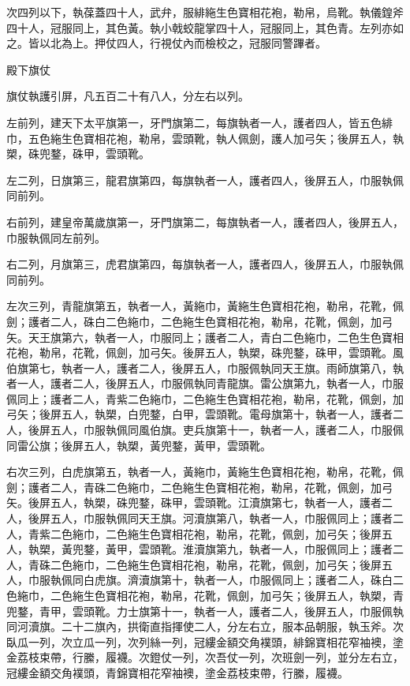 \begin{pinyinscope}
 次四列以下，執葆蓋四十人，武弁，服緋絁生色寶相花袍，勒帛，烏靴。執儀鍠斧四十人，冠服同上，其色黃。執小戟蛟龍掌四十人，冠服同上，其色青。左列亦如之。皆以北為上。押仗四人，行視仗內而檢校之，冠服同警蹕者。



 殿下旗仗



 旗仗執護引屏，凡五百二十有八人，分左右以列。



 左前列，建天下太平旗第一，牙門旗第二，每旗執者一人，護者四人，皆五色緋巾，五色絁生色寶相花袍，勒帛，雲頭靴，執人佩劍，護人加弓矢；後屏五人，執槊，硃兜鍪，硃甲，雲頭靴。



 左二列，日旗第三，龍君旗第四，每旗執者一人，護者四人，後屏五人，巾服執佩同前列。



 右前列，建皇帝萬歲旗第一，牙門旗第二，每旗執者一人，護者四人，後屏五人，巾服執佩同左前列。



 右二列，月旗第三，虎君旗第四，每旗執者一人，護者四人，後屏五人，巾服執佩同前列。



 左次三列，青龍旗第五，執者一人，黃絁巾，黃絁生色寶相花袍，勒帛，花靴，佩劍；護者二人，硃白二色絁巾，二色絁生色寶相花袍，勒帛，花靴，佩劍，加弓矢。天王旗第六，執者一人，巾服同上；護者二人，青白二色絁巾，二色生色寶相花袍，勒帛，花靴，佩劍，加弓矢。後屏五人，執槊，硃兜鍪，硃甲，雲頭靴。風伯旗第七，執者一人，護者二人，後屏五人，巾服佩執同天王旗。雨師旗第八，執者一人，護者二人，後屏五人，巾服佩執同青龍旗。雷公旗第九，執者一人，巾服佩同上；護者二人，青紫二色絁巾，二色絁生色寶相花袍，勒帛，花靴，佩劍，加弓矢；後屏五人，執槊，白兜鍪，白甲，雲頭靴。電母旗第十，執者一人，護者二人，後屏五人，巾服執佩同風伯旗。吏兵旗第十一，執者一人，護者二人，巾服佩同雷公旗；後屏五人，執槊，黃兜鍪，黃甲，雲頭靴。



 右次三列，白虎旗第五，執者一人，黃絁巾，黃絁生色寶相花袍，勒帛，花靴，佩劍；護者二人，青硃二色絁巾，二色絁生色寶相花袍，勒帛，花靴，佩劍，加弓矢。後屏五人，執槊，硃兜鍪，硃甲，雲頭靴。江瀆旗第七，執者一人，護者二人，後屏五人，巾服執佩同天王旗。河瀆旗第八，執者一人，巾服佩同上；護者二人，青紫二色絁巾，二色絁生色寶相花袍，勒帛，花靴，佩劍，加弓矢；後屏五人，執槊，黃兜鍪，黃甲，雲頭靴。淮瀆旗第九，執者一人，巾服佩同上；護者二人，青硃二色絁巾，二色絁生色寶相花袍，勒帛，花靴，佩劍，加弓矢；後屏五人，巾服執佩同白虎旗。濟瀆旗第十，執者一人，巾服佩同上；護者二人，硃白二色絁巾，二色絁生色寶相花袍，勒帛，花靴，佩劍，加弓矢；後屏五人，執槊，青兜鍪，青甲，雲頭靴。力士旗第十一，執者一人，護者二人，後屏五人，巾服佩執同河瀆旗。二十二旗內，拱衛直指揮使二人，分左右立，服本品朝服，執玉斧。次臥瓜一列，次立瓜一列，次列絲一列，冠縷金額交角襆頭，緋錦寶相花窄袖襖，塗金荔枝束帶，行縢，履襪。次鐙仗一列，次吾仗一列，次班劍一列，並分左右立，冠縷金額交角襆頭，青錦寶相花窄袖襖，塗金荔枝束帶，行縢，履襪。




\end{pinyinscope}
